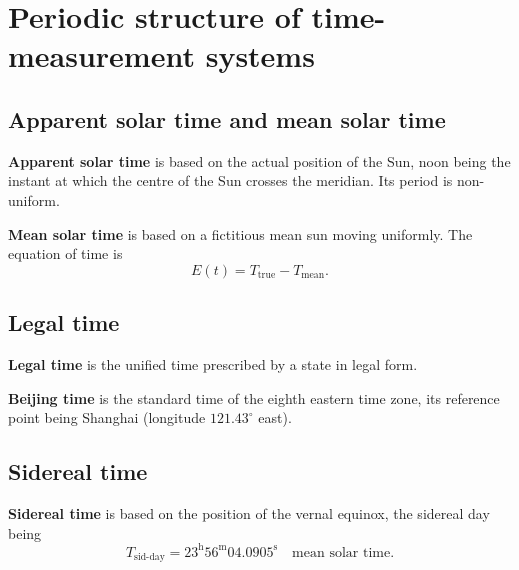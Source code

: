 \section{Periodic structure of time-measurement systems}
\label{sec:astro_time_measurement}

\subsection{Apparent solar time and mean solar time}

\begin{definition}\label{def:true_solar_time}
\textbf{Apparent solar time} is based on the actual position of the Sun, noon being the instant at which the centre of the Sun crosses the meridian. Its period is non-uniform.
\end{definition}

\begin{definition}\label{def:mean_solar_time}
\textbf{Mean solar time} is based on a fictitious mean sun moving uniformly. The equation of time is
\[
E(t)=T_{\text{true}}-T_{\text{mean}}.
\]
\end{definition}

\subsection{Legal time}

\begin{definition}\label{def:legal_time}
\textbf{Legal time} is the unified time prescribed by a state in legal form.
\end{definition}

\begin{definition}\label{def:beijing_time}
\textbf{Beijing time} is the standard time of the eighth eastern time zone, its reference point being Shanghai (longitude \(121.43^\circ\) east).
\end{definition}

\subsection{Sidereal time}

\begin{definition}\label{def:sidereal_time}
\textbf{Sidereal time} is based on the position of the vernal equinox, the sidereal day being
\[
T_{\text{sid-day}}=23^{\text{h}}56^{\text{m}}04.0905^{\text{s}}\quad\text{mean solar time}.
\]
\end{definition}

